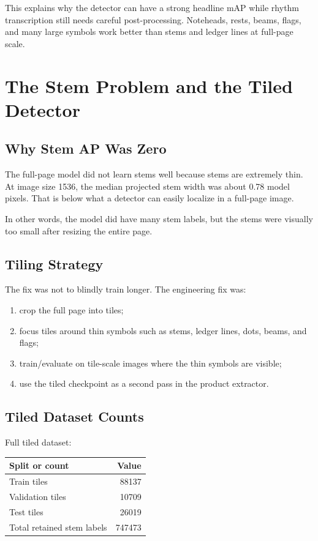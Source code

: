 \documentclass[11pt]{article}
\begin{document}
This explains why the detector can have a strong headline mAP while rhythm transcription still needs careful post-processing. Noteheads, rests, beams, flags, and many large symbols work better than stems and ledger lines at full-page scale.

\section{The Stem Problem and the Tiled Detector}

\subsection{Why Stem AP Was Zero}

The full-page model did not learn stems well because stems are extremely thin. At image size 1536, the median projected stem width was about 0.78 model pixels. That is below what a detector can easily localize in a full-page image.

In other words, the model did have many stem labels, but the stems were visually too small after resizing the entire page.

\subsection{Tiling Strategy}

The fix was not to blindly train longer. The engineering fix was:

\begin{enumerate}
  \item crop the full page into tiles;
  \item focus tiles around thin symbols such as stems, ledger lines, dots, beams, and flags;
  \item train/evaluate on tile-scale images where the thin symbols are visible;
  \item use the tiled checkpoint as a second pass in the product extractor.
\end{enumerate}

\subsection{Tiled Dataset Counts}

Full tiled dataset:

\begin{center}
\begin{tabular}{lr}
\toprule
\textbf{Split or count} & \textbf{Value}\\
\midrule
Train tiles & 88137\\
Validation tiles & 10709\\
Test tiles & 26019\\
Total retained stem labels & 747473\\
\bottomrule
\end{tabular}
\end{center}
\end{document}
